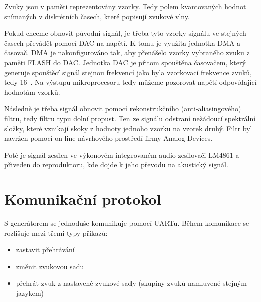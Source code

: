 Zvuky jsou v paměti reprezentovány vzorky. Tedy polem kvantovaných hodnot snímaných v diskrétních časech, které popisují zvukové vlny.

Pokud chceme obnovit původní signál, je třeba tyto vzorky signálu ve stejných časech převádět pomocí DAC na napětí. K tomu je využita jednotka DMA a časovač. DMA je nakonfigurováno tak, aby přenášelo vzorky vybraného zvuku z paměti FLASH do DAC. Jednotka DAC je přitom spouštěna časovačem, který generuje spouštěcí signál stejnou frekvencí jako byla vzorkovací frekvence zvuků, tedy 16~. Na výstupu mikroprocesoru tedy můžeme pozorovat napětí odpovídající hodnotám vzorků.

Následně je třeba signál obnovit pomocí rekonstrukčního (anti-aliasingového) filtru, tedy filtru typu dolní propust. Ten ze signálu odstraní nežádoucí spektrální složky, které vznikají skoky z hodnoty jednoho vzorku na vzorek druhý. Filtr byl navržen pomocí on-line návrhového prostředí firmy Analog Devices.

Poté je signál zesílen ve výkonovém integrovaném audio zesilovači LM4861 a přiveden do reproduktoru, kde dojde k jeho převodu na akustický signál.

\section{Komunikační protokol}
S generátorem se jednoduše komunikuje pomocí UARTu. Během komunikace se rozlišuje mezi třemi typy příkazů:
\begin{itemize}
    \item zastavit přehrávání
    \item změnit zvukovou sadu
    \item přehrát zvuk z nastavené zvukové sady (skupiny zvuků namluvené stejným jazykem)
\end{itemize}


